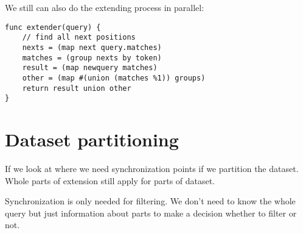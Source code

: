 We still can also do the extending process in parallel:

\begin{verbatim}
func extender(query) {
	// find all next positions
	nexts = (map next query.matches)
	matches = (group nexts by token)
	result = (map newquery matches)
	other = (map #(union (matches %1)) groups)
	return result union other
}
\end{verbatim}

\section{Dataset partitioning}

If we look at where we need synchronization points
if we partition the dataset. Whole parts of 
extension still apply for parts of dataset.

Synchronization is only needed for filtering.
We don't need to know the whole query but just
information about parts to make a decision whether
to filter or not.


